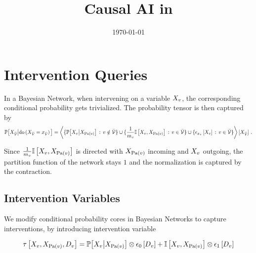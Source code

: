 \documentclass[aps,onecolumn,nofootinbib,pra]{article}
\newcommand{\doof}[1]{\mathrm{do}\left(#1\right)}
\newcommand{\dovariable}{D}
\newcommand{\dovariableof}[1]{\dovariable_{#1}}
\begin{document}
    \title{Causal AI in \tnreason}

    \maketitle
    \date{\today}


    \section{Intervention Queries}

    In a Bayesian Network, when intervening on a variable $X_{v}$, the corresponding conditional probability gets trivialized.
    The probability tensor is then captured by
    \begin{align*}
        \condprobat{\catvariableof{\secnodes}}{\doof{\indexedcatvariableof{\thirdnodes}}}
        = \contractionof{
            \{\condprobof{\catvariableof{\node}}{\catvariableof{\parentsof{\node}}} \,:\, \node\notin\thirdnodes \}
            \cup \{\frac{1}{\catdimof{\node}} \onesat{\catvariableof{\node},\catvariableof{\parentsof{\node}}} \,:\, \node\in\thirdnodes\}
            \cup \{\onehotmapofat{\catindexof{\node}}{\catvariableof{\node}} \,:\, \node\in\thirdnodes\}
        }{\catvariableof{\secnodes}} \, .
    \end{align*}

    Since $\frac{1}{m_{v}} \mathbb{I}\left[X_{v},X_{\mathrm{Pa}(v)}\right]$ is directed with $X_{\mathrm{Pa}(v)}$ incoming and $X_{v}$ outgoing, the partition function of the network stays $1$ and the normalization is captured by the contraction.

    \subsection{Intervention Variables}

    We modify conditional probability cores in Bayesian Networks to capture interventions, by introducing intervention variable

    \begin{align*}
        \hypercoreat{\catvariableof{\node},\catvariableof{\parentsof{\node}},\dovariableof{\node}}
        = \condprobat{\catvariableof{\node}}{\catvariableof{\parentsof{\node}}} \otimes \onehotmapofat{0}{\dovariableof{\node}}
        + \onesat{\catvariableof{\node},\catvariableof{\parentsof{\node}}} \otimes \tbasisat{\dovariableof{\node}}
    \end{align*}
\end{document}
